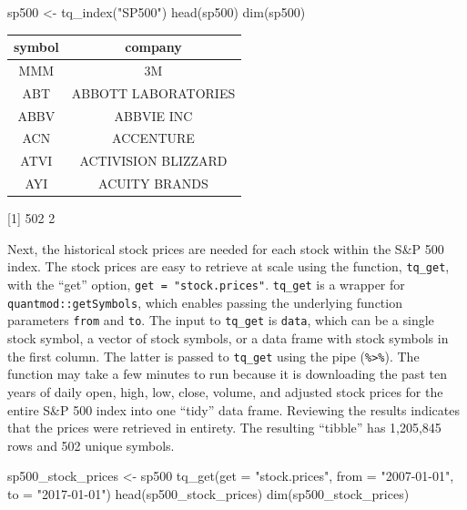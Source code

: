 \begin{Schunk}
\begin{Sinput}
sp500 <- tq_index("SP500")
head(sp500)
dim(sp500)
\end{Sinput}
\end{Schunk}

\begin{tabular}{cc}
\toprule
symbol & company\\
\midrule
MMM & 3M\\
ABT & ABBOTT LABORATORIES\\
ABBV & ABBVIE INC\\
ACN & ACCENTURE\\
ATVI & ACTIVISION BLIZZARD\\
AYI & ACUITY BRANDS\\
\bottomrule
\end{tabular}

{[}1{]} 502 2

\hspace{20 mm}

Next, the historical stock prices are needed for each stock within the
S\&P 500 index. The stock prices are easy to retrieve at scale using the
function, \texttt{tq\_get}, with the ``get'' option,
\texttt{get\ =\ "stock.prices"}. \texttt{tq\_get} is a wrapper for
\texttt{quantmod::getSymbols}, which enables passing the underlying
function parameters \texttt{from} and \texttt{to}. The input to
\texttt{tq\_get} is \texttt{data}, which can be a single stock symbol, a
vector of stock symbols, or a data frame with stock symbols in the first
column. The latter is passed to \texttt{tq\_get} using the pipe
(\texttt{\%\textgreater{}\%}). The function may take a few minutes to
run because it is downloading the past ten years of daily open, high,
low, close, volume, and adjusted stock prices for the entire S\&P 500
index into one ``tidy'' data frame. Reviewing the results indicates that
the prices were retrieved in entirety. The resulting ``tibble'' has
1,205,845 rows and 502 unique symbols.

\begin{Schunk}
\begin{Sinput}
sp500_stock_prices <- sp500 %
    tq_get(get  = "stock.prices", 
           from = "2007-01-01", 
           to   = "2017-01-01")
head(sp500_stock_prices)
dim(sp500_stock_prices)
\end{Sinput}
\end{Schunk}

